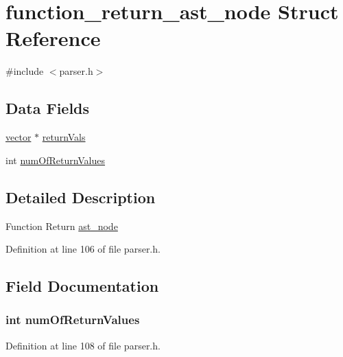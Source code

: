 \hypertarget{structfunction__return__ast__node}{\section{function\+\_\+return\+\_\+ast\+\_\+node Struct Reference}
\label{structfunction__return__ast__node}
}


{\ttfamily \#include $<$parser.\+h$>$}

\subsection*{Data Fields}
\begin{DoxyCompactItemize}
\item 
\hyperlink{structvector}{vector} $\ast$ \hyperlink{structfunction__return__ast__node_affc2b618d4e05bd2a134699a48a5b06f}{return\+Vals}
\item 
int \hyperlink{structfunction__return__ast__node_a53a6c9388097639e5b67cd4b368f98d1}{num\+Of\+Return\+Values}
\end{DoxyCompactItemize}


\subsection{Detailed Description}
Function Return \hyperlink{structast__node}{ast\+\_\+node} 

Definition at line 106 of file parser.\+h.



\subsection{Field Documentation}
\hypertarget{structfunction__return__ast__node_a53a6c9388097639e5b67cd4b368f98d1}{
\subsubsection[{num\+Of\+Return\+Values}]{\setlength{\rightskip}{0pt plus 5cm}int num\+Of\+Return\+Values}}\label{structfunction__return__ast__node_a53a6c9388097639e5b67cd4b368f98d1}


Definition at line 108 of file parser.\+h.

